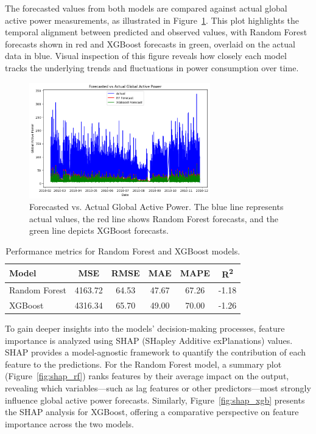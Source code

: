 	The forecasted values from both models are compared against actual global active power measurements, as illustrated in Figure~\ref{fig:forecast_plot}. This plot highlights the temporal alignment between predicted and observed values, with Random Forest forecasts shown in red and XGBoost forecasts in green, overlaid on the actual data in blue. Visual inspection of this figure reveals how closely each model tracks the underlying trends and fluctuations in power consumption over time.
	
	\begin{figure}[ht]
		\centering
		\includegraphics[width=0.7\textwidth]{./figures_aman/path_to_forecast_plot.png} %
		\caption{Forecasted vs. Actual Global Active Power. The blue line represents actual values, the red line shows Random Forest forecasts, and the green line depicts XGBoost forecasts.}
		\label{fig:forecast_plot}
	\end{figure}
	
	\begin{table}[h]
		\centering
		\caption{Performance metrics for Random Forest and XGBoost models.}
		\label{tab:ml_results}
		\begin{tabular}{lccccc}
			\toprule
			\textbf{Model} & \textbf{MSE} & \textbf{RMSE} & \textbf{MAE} & \textbf{MAPE} & \textbf{R\textsuperscript{2}} \\
			\midrule
			Random Forest & 4163.72 & 64.53 & 47.67 & 67.26 & -1.18 \\
			XGBoost       & 4316.34 & 65.70 & 49.00 & 70.00 & -1.26 \\
			\bottomrule
		\end{tabular}
	\end{table}
	
	To gain deeper insights into the models’ decision-making processes, feature importance is analyzed using SHAP (SHapley Additive exPlanations) values. SHAP provides a model-agnostic framework to quantify the contribution of each feature to the predictions. For the Random Forest model, a summary plot (Figure~\ref{fig:shap_rf}) ranks features by their average impact on the output, revealing which variables—such as lag features or other predictors—most strongly influence global active power forecasts. Similarly, Figure~\ref{fig:shap_xgb} presents the SHAP analysis for XGBoost, offering a comparative perspective on feature importance across the two models.
	
